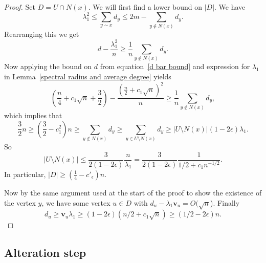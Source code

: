 \begin{proof}
Set $D = U \cap N(x)$.  We will first find a lower bound on $|D|$.  We have
 \begin{equation*}
  \lambda_1^2 \leq \sum_{y \sim x} d_y \leq 2m - \sum_{y \not \in N(x)} d_y.
 \end{equation*}
Rearranging this we get 
 \[ d - \frac{\lambda_1^2}{n} \geq \frac{1}{n} \sum_{y \not \in N(x)} d_y.\]
Now applying the bound on $d$ from equation~\ref{d bar bound} and expression for $\lambda_1$ in Lemma~\ref{spectral radius and average degree} yields
 \[ \left( \frac{n}{4} + c_1 \sqrt{n} + \frac{3}{2}\right) - \frac{\left(\frac{n}{2} + c_1 \sqrt{n}\right)^2}{n} \geq \frac{1}{n} \sum_{y \not \in N(x)} d_y, \]
which implies that
 \[ \frac{3}{2} n \geq \left( \frac{3}{2} - c_1^2 \right) n \geq \sum_{y \not \in N(x)} d_y \geq \sum_{y \in U\setminus N(x)} d_y \geq |U\setminus N(x)| (1-2\epsilon) \lambda_1 .\]
So 
 \[ |U \setminus N(x)| \leq \frac{3}{2(1-2\epsilon)} \frac{n}{\lambda_1} = \frac{3}{2(1-2\epsilon)} \frac{1}{1/2 + c_1 n^{-1/2}} .\]
In particular, $|D| \geq (\frac{1}{4} - c'_\epsilon) n$.

Now by the same argument used at the start of the proof to show the existence
of the vertex $y$, we have some vertex $u \in D$
with $d_u - \lambda_1 \mathbf{v}_u = O(\sqrt{n}$).   Finally 
\[d_u \geq \mathbf{v}_u \lambda_1 \geq (1 - 2 \epsilon) (n/2 + c_1\sqrt{n}) \geq \left( 1/2 - 2\epsilon \right)n .  \]

\end{proof}

\subsection{Alteration step}

